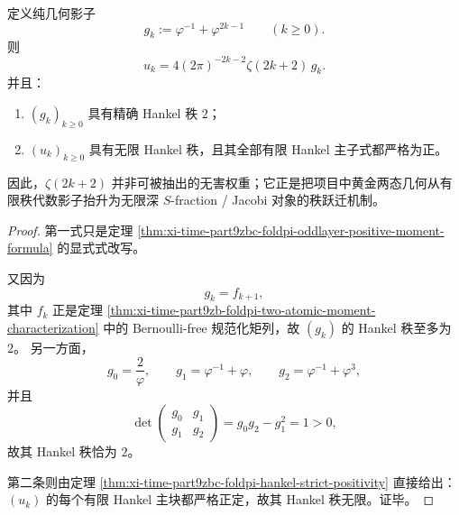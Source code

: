 \begin{theorem}\label{thm:xi-time-part9zbc-foldpi-zeta-rank-jump}
定义纯几何影子
\[
g_k:=\varphi^{-1}+\varphi^{2k-1}
\qquad (k\ge 0).
\]
则
\[
u_k
=
4(2\pi)^{-2k-2}\zeta(2k+2)\,g_k.
\]
并且：
\begin{enumerate}
  \item \((g_k)_{k\ge 0}\) 具有精确 Hankel 秩 \(2\)；
  \item \((u_k)_{k\ge 0}\) 具有无限 Hankel 秩，且其全部有限 Hankel 主子式都严格为正。
\end{enumerate}
因此，\(\zeta(2k+2)\) 并非可被抽出的无害权重；它正是把项目中黄金两态几何从有限秩代数影子抬升为无限深 \(S\)-fraction / Jacobi 对象的秩跃迁机制。
\end{theorem}
\begin{proof}
第一式只是定理 \ref{thm:xi-time-part9zbc-foldpi-oddlayer-positive-moment-formula} 的显式式改写。

又因为
\[
g_k=f_{k+1},
\]
其中 \(f_k\) 正是定理 \ref{thm:xi-time-part9zb-foldpi-two-atomic-moment-characterization} 中的 Bernoulli-free 规范化矩列，故 \((g_k)\) 的 Hankel 秩至多为 \(2\)。
另一方面，
\[
g_0=\frac{2}{\varphi},
\qquad
g_1=\varphi^{-1}+\varphi,
\qquad
g_2=\varphi^{-1}+\varphi^3,
\]
并且
\[
\det
\begin{pmatrix}
g_0 & g_1\\
g_1 & g_2
\end{pmatrix}
=
g_0g_2-g_1^2
=1>0,
\]
故其 Hankel 秩恰为 \(2\)。

第二条则由定理 \ref{thm:xi-time-part9zbc-foldpi-hankel-strict-positivity} 直接给出：\((u_k)\) 的每个有限 Hankel 主块都严格正定，故其 Hankel 秩无限。证毕。
\end{proof}


